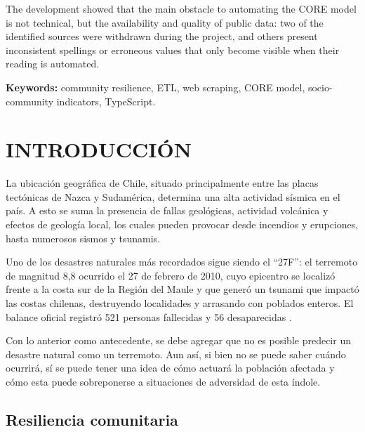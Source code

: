 \documentclass[12pt,letterpaper,oneside]{report}
\begin{document}
The development showed that the main obstacle to automating the CORE model is not technical, but the availability and quality of public data: two of the identified sources were withdrawn during the project, and others present inconsistent spellings or erroneous values that only become visible when their reading is automated.

\textbf{Keywords:} community resilience, ETL, web scraping, CORE model, socio-community indicators, TypeScript.

\newpage


\chapter{INTRODUCCI\'ON}
\label{ch:introduccion}

La ubicaci\'on geogr\'afica de Chile, situado principalmente entre las placas tect\'onicas de Nazca y Sudam\'erica, determina una alta actividad s\'ismica en el pa\'is. A esto se suma la presencia de fallas geol\'ogicas, actividad volc\'anica y efectos de geolog\'ia local, los cuales pueden provocar desde incendios y erupciones, hasta numerosos sismos y tsunamis.

Uno de los desastres naturales m\'as recordados sigue siendo el ``27F'': el terremoto de magnitud 8,8 ocurrido el 27 de febrero de 2010, cuyo epicentro se localiz\'o frente a la costa sur de la Regi\'on del Maule y que gener\'o un tsunami que impact\'o las costas chilenas, destruyendo localidades y arrasando con poblados enteros. El balance oficial registr\'o 521 personas fallecidas y 56 desaparecidas \parencite{memoriachilena}.

Con lo anterior como antecedente, se debe agregar que no es posible predecir un desastre natural como un terremoto. Aun as\'i, si bien no se puede saber cu\'ando ocurrir\'a, s\'i se puede tener una idea de c\'omo actuar\'a la poblaci\'on afectada y c\'omo esta puede sobreponerse a situaciones de adversidad de esta \'indole.

\section{Resiliencia comunitaria}
\label{sec:resiliencia}
\end{document}
